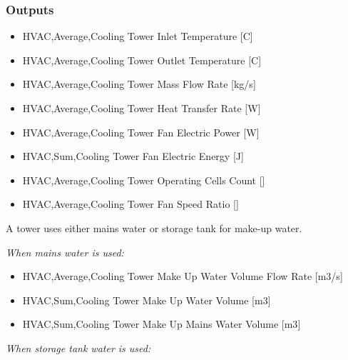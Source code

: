 \subsubsection{Outputs}\label{outputs-2-003}

\begin{itemize}
\item
  HVAC,Average,Cooling Tower Inlet Temperature {[}C{]}
\item
  HVAC,Average,Cooling Tower Outlet Temperature {[}C{]}
\item
  HVAC,Average,Cooling Tower Mass Flow Rate {[}kg/s{]}
\item
  HVAC,Average,Cooling Tower Heat Transfer Rate {[}W{]}
\item
  HVAC,Average,Cooling Tower Fan Electric Power {[}W{]}
\item
  HVAC,Sum,Cooling Tower Fan Electric Energy {[}J{]}
\item
  HVAC,Average,Cooling Tower Operating Cells Count {[]}
\item
  HVAC,Average,Cooling Tower Fan Speed Ratio {[]}
\end{itemize}

A tower uses either mains water or storage tank for make-up water.

\emph{When mains water is used:}

\begin{itemize}
\item
  HVAC,Average,Cooling Tower Make Up Water Volume Flow Rate {[}m3/s{]}
\item
  HVAC,Sum,Cooling Tower Make Up Water Volume {[}m3{]}
\item
  HVAC,Sum,Cooling Tower Make Up Mains Water Volume {[}m3{]}
\end{itemize}

\emph{When storage tank water is used:}

